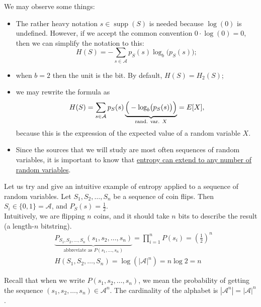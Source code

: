 \documentclass{report}
\DeclareMathOperator{\supp}{supp}
\begin{document}
\begin{remark} We may observe some things:
	\begin{itemize}
		\item The rather heavy notation $s \in \supp (S)$ is needed because $\log(0)$ is undefined. However, if we accept the common convention $0 \cdot \log(0) = 0$, then we can simplify the notation to this: \begin{equation*}H(S) = - \sum_{s \in \mathcal A} p_S(s) \log_b \bigl(p_S(s)\bigr); \end{equation*}
		\item when $b=2$ then the unit is the bit. By default, $H(S) = H_2(S)$;
		\item we may rewrite the formula as
		\begin{equation*}
		H(S) = \sum\limits_{s \in \mathcal A} p_S(s) \underbrace{\Bigr(-\log_b \bigl(p_S(s)\bigl) \Bigl)}_{\text{rand. var. $X$}} = E[X],
		\end{equation*}
		because this is the expression of the expected value of a random variable $X$.
		\item Since the sources that we will study are most often sequences of random variables, it is important to know that \ul{entropy can extend to any number of random variables}.
	\end{itemize}
\end{remark}

\begin{exmp}
	Let us try and give an intuitive example of entropy applied to a sequence of random variables. Let $S_1, S_2, \ldots, S_n$ be a sequence of coin flips. Then $S_i \in \{0, 1\} = \mathcal A$, and $P_S(s) = \frac12$. \\
Intuitively, we are flipping $n$ coins, and it should take $n$ bits to describe the result (a length-$n$ bitstring).
\begin{align*}
	&\underbrace{P_{S_1, S_2, \ldots, S_n}(s_1, s_2, \ldots, s_n)}_{\text{abbreviate as } P(s_1, \ldots, s_n)} = \prod_{i=1}^n P(s_i) = \left(\frac12 \right)^n \\
	&H(S_1, S_2, \ldots, S_n) = \log\left(|\mathcal A|^n \right) = n \log 2 = n
\end{align*}

Recall that when we write $P(s_1, s_2, \ldots, s_n)$, we mean the probability of getting the sequence $(s_1, s_2, \ldots, s_n) \in \mathcal A^n$. The cardinality of the alphabet is $|\mathcal A^n| = |\mathcal A|^n$.
\end{exmp}
\end{document}
